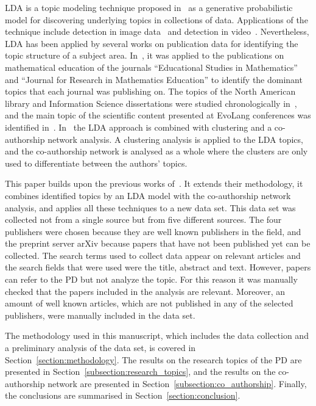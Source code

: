 \documentclass{article}
\theoremstyle{definition}
\begin{document}
LDA is a topic modeling technique proposed
in~\cite{Blei2003} as a generative probabilistic model for discovering
underlying topics in collections of data.
Applications of the technique include detection in image data~\cite{
Coelho2010} and detection in video~\cite{Wang2008}. Nevertheless,
LDA has been applied by several works on publication data for identifying the
topic structure of a subject area. In~\cite{Inglis2018}, it was applied to the
publications on mathematical education of the journals ``Educational Studies in
Mathematics'' and ``Journal for Research in Mathematics Education'' to
identify the dominant topics that each journal was publishing on. The topics of
the North American library and Information Science dissertations were 
studied chronologically in~\cite{Sugimoto2011}, and the main topic of the
scientific content presented at EvoLang conferences was identified
in~\cite{Bergmann2018}. In~\cite{Bergmann2018} the LDA approach is combined with
clustering and a co-authorship network analysis. A clustering analysis is
applied to the LDA topics, and the co-authorship network is analysed as a whole
where the clusters are only used to differentiate between the authors' topics.

This paper builds upon the previous works of~\cite{Bergmann2018, Liu2015,
youngblood2018}. It extends their methodology, it combines identified topics by
an LDA model with the co-authorship network analysis, and applies all these
techniques to a new data set. This data set was collected not from a single
source but from five different sources. The four publishers were chosen because
they are well known publishers in the field, and the preprint server arXiv
because papers that have not been published yet can be collected. The search
terms used to collect data appear on relevant articles and the search fields
that were used were the title, abstract and text. However, papers can refer to
the PD but not analyze the topic. For this reason it was manually checked that
the papers included in the analysis are relevant. Moreover, an amount of well
known articles, which are not published in any of the selected publishers, were
manually included in the data set.


The methodology used in this manuscript, which
includes the data collection and a preliminary analysis of the data set, is
covered in Section~\ref{section:methodology}. The results on the research topics
of the PD are presented in Section~\ref{subsection:research_topics}, and the
results on the co-authorship network are presented in
Section~\ref{subsection:co_authorship}. Finally, the conclusions are summarised
in Section~\ref{section:conclusion}.
\end{document}
